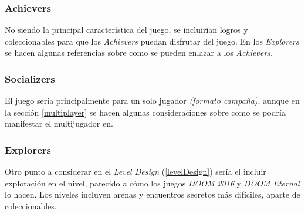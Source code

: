         \subsubsection{Achievers}
            No siendo la principal característica del juego, se incluirían logros y coleccionables para que los \textit{Achievers} puedan disfrutar del juego. En los \textit{Explorers} se hacen algunas referencias sobre como se pueden enlazar a los \textit{Achievers}.
        \subsubsection{Socializers}
            El juego sería principalmente para un solo jugador \textit{(formato campaña)}, aunque en la sección \ref{multiplayer} se hacen algunas consideraciones sobre como se podría manifestar el multijugador en\TWD.
        \subsubsection{Explorers}
            Otro punto a considerar en el \textit{Level Design} (\ref{levelDesign}) sería el incluir exploración en el nivel, parecido a cómo los juegos \textit{DOOM 2016} y \textit{DOOM Eternal} lo hacen. Los niveles incluyen arenas y encuentros secretos más difíciles, aparte de coleccionables.


